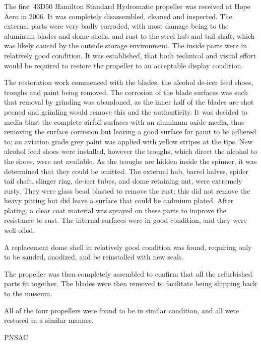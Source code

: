 The first 43D50 Hamilton Standard Hydromatic propeller was received at Hope
Aero in 2006. It was completely disassembled, cleaned and inspected. The
external parts were very badly corroded, with most damage being to the aluminum
blades and dome shells, and rust to the steel hub and tail shaft, which was
likely caused by the outside storage environment. The inside parts were in
relatively good condition. It was established, that both technical and visual
effort would be required to restore the propeller to an acceptable display
condition.

The restoration work commenced with the blades, the alcohol de-icer feed shoes,
troughs and paint being removed. The corrosion of the blade surfaces was such
that removal by grinding was abandoned, as the inner half of the blades are
shot peened and grinding would remove this and the authenticity. It was decided
to media blast the complete airfoil surfaces with an aluminum oxide media, thus
removing the surface corrosion but leaving a good surface for paint to be
adhered to; an aviation grade grey paint was applied with yellow stripes at the
tips. New alcohol feed shoes were installed, however the troughs, which direct
the alcohol to the shoes, were not available. As the troughs are hidden inside
the spinner, it was determined that they could be omitted.
The external hub, barrel halves, spider tail shaft, slinger ring, de-icer
tubes, and dome retaining nut, were extremely rusty. They were glass bead
blasted to remove the rust; this did not remove the heavy pitting but did leave
a surface that could be cadmium plated.  After plating, a clear coat material
was sprayed on these parts to improve the resistance to rust. The internal
surfaces were in good condition, and they were well oiled. 

A replacement dome shell in relatively good condition was found, requiring only
to be sanded, anodized, and be reinstalled with new seals.

The propeller was then completely assembled to confirm that all the refurbished
parts fit together. The blades were then removed to facilitate being shipping
back to the museum.

All of the four propellers were  found to be in similar condition, and all were
restored in a similar manner.

\begin{footnotesize}
    \raggedleft PNSAC\\
\end{footnotesize}




